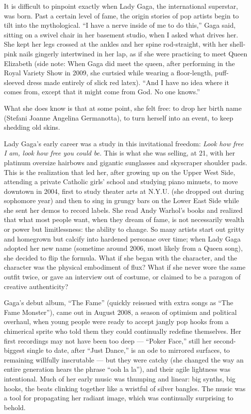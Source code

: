 It is difficult to pinpoint exactly when Lady Gaga, the international
superstar, was born. Past a certain level of fame, the origin stories of
pop artists begin to tilt into the mythological. ``I have a nerve inside
of me to do this,'' Gaga said, sitting on a swivel chair in her basement
studio, when I asked what drives her. She kept her legs crossed at the
ankles and her spine rod-straight, with her shell-pink nails gingerly
intertwined in her lap, as if she were practicing to meet Queen
Elizabeth (side note: When Gaga did meet the queen, after performing in
the Royal Variety Show in 2009, she curtsied while wearing a
floor-length, puff-sleeved dress made entirely of slick red latex).
``And I have no idea where it comes from, except that it might come from
God. No one knows.''

What she does know is that at some point, she felt free: to drop her
birth name (Stefani Joanne Angelina Germanotta), to turn herself into an
event, to keep shedding old skins.

Lady Gaga's early career was a study in this invitational freedom:
\emph{Look how free I am, look how free you could be.} This is what she
was selling, at 21, with her platinum oversize hairbows and gigantic
sunglasses and skyscraper shoulder pads. This is the realization that
led her, after growing up on the Upper West Side, attending a private
Catholic girls' school and studying piano minuets, to move downtown in
2004, first to study theater arts at N.Y.U. (she dropped out during
sophomore year) and then to sing in grungy bars on the Lower East Side
while she sent her demos to record labels. She read Andy Warhol's books
and realized that what most people want, when they dream of fame, is not
necessarily wealth or power but limitlessness: the ability to change. So
many artists start out gritty and homegrown but calcify into hardened
personae over time; when Lady Gaga adopted her new name (sometime around
2006, most likely from a Queen song), she decided to flip the formula.
What if she began with the character, and the character was the physical
embodiment of flux? What if she never wore the same outfit twice, or
gave an interview out of costume, or claimed to be a paragon of creative
authenticity?

Gaga's debut album, ``The Fame'' (quickly reissued with extra songs as
``The Fame Monster''), came out in August 2008, a season of optimism and
political overhaul, when young people were ready to accept jangly pop
hooks from a chimerical sprite who told them they could continually
redefine themselves. Her first recordings may not have been too deep ---
``Poker Face,'' still her second-biggest single to date, after ``Just
Dance,'' is an ode to mirrored surfaces, to remaining willfully
inscrutable --- but they were catchy (she changed the way an entire
generation hears the phrase ``ooh la la''), and their agile lightness
was intentional. Much of her early music was thumping and linear: big
synths, big hooks, the beats clinking together like a wristful of silver
bangles. The music was a tool for propagating her radiant image, which
was continually surprising to behold.

